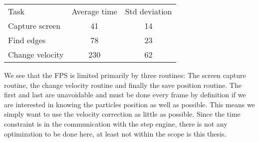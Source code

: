 \begin{table}[H]
 \begin{tabular}{l | c | c } 
 Task  			&  Average time & Std deviation \\
 Capture screen & 41 			& 14 \\
 Find edges 	& 78			& 23 \\
 Change velocity& 230			& 62 \\
 \end{tabular}
 \caption{}
 \label{tab:benchmarks}
\end{table}

We see that the FPS is limited primarily by three routines: The screen capture routine, the change velocity routine and finally the save position routine. The first and last are unavoidable and must be done every frame by definition if we are interested in knowing the particles position as well as possible. This means we simply want to use the velocity correction as little as possible. Since the time constraint is in the communication with the step engine, there is not any optimization to be done here, at least not within the scope is this thesis. 
